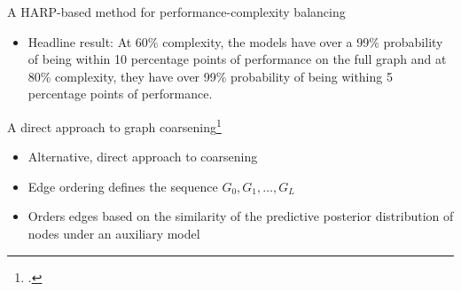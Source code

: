 \documentclass[10pt]{beamer}
\begin{document}
\begin{frame}{A HARP-based method for performance-complexity balancing}
	\begin{itemize}
		\item<2-> Headline result: At 60\% complexity, the models have over a 99\% probability of being within 10 percentage points of performance on the full graph and at 80\% complexity, they have over 99\% probability of being withing 5 percentage points of performance.
	\end{itemize}

	\vfill

	\centering
\end{frame}

\begin{frame}{A direct approach to graph coarsening\footcite{prochazka_scalable_2022}}
	\begin{itemize}
		\item<1-> Alternative, direct approach to coarsening
		\item<2-> Edge ordering defines the sequence \( G_0, G_1, \dots, G_L \)
		\item<3-> Orders edges based on the similarity of the predictive posterior distribution of nodes under an auxiliary model
	\end{itemize}

	\vfill

	\centering
\end{frame}
\end{document}
